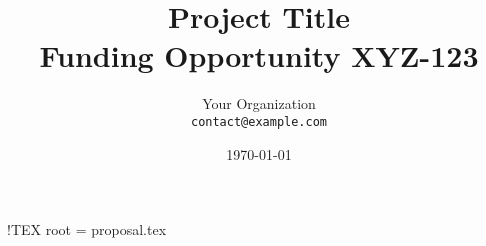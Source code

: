 !TEX root = proposal.tex
\usepackage[utf8]{inputenc}
\usepackage[T1]{fontenc}
\usepackage{lmodern}
\usepackage{microtype}

\usepackage{geometry}
\geometry{margin=1in}

\usepackage{graphicx}
\usepackage{float}
\usepackage{subcaption}
\usepackage{booktabs}
\usepackage{array}
\usepackage{longtable}

\usepackage{amsmath, amssymb}
\usepackage{siunitx}

\usepackage{hyperref}

\usepackage[backend=biber,style=ieee]{biblatex}


\title{Project Title \\ \large Funding Opportunity XYZ-123}
\author{Your Organization \\ \texttt{contact@example.com}}
\date{\today}
